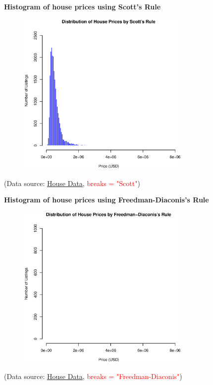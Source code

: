 \documentclass[19pt,landscaoe]{article}
\begin{document}
\newpage
{\LARGE{\textbf{Histogram of house prices using Scott's Rule}}}
\vskip25pt

\begin{figure}[h]
\centering
      \includegraphics[width=0.75\textwidth,height=0.52\textwidth]{hist_housing_Scott.eps}
    \label{6} 
\end{figure}
(Data source: \href{https://raw.githubusercontent.com/rashida048/Datasets/master/home_data.csv}{House Data}, \textcolor{red}{breaks = "Scott"})

\newpage
{\LARGE{\textbf{Histogram of house prices using Freedman-Diaconis's Rule}}}
\vskip25pt

\begin{figure}[h]
\centering
      \includegraphics[width=0.75\textwidth,height=0.52\textwidth]{hist_housing_Freedman.eps}
    \label{figure7} 
\end{figure}
(Data source: \href{https://raw.githubusercontent.com/rashida048/Datasets/master/home_data.csv}{House Data}, \textcolor{red}{breaks = "Freedman-Diaconis"})
\end{document}
